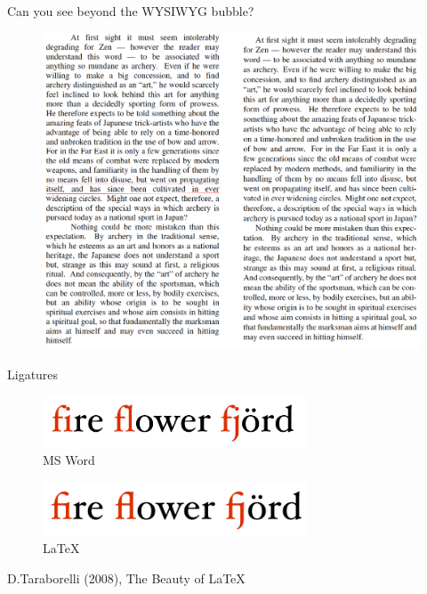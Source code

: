 \documentclass[10pt,times]{beamer}
\begin{document}
\begin{frame}{Can you see beyond the WYSIWYG bubble?}
\begin{figure}
\includegraphics[height=0.85\textheight]{figs/LaTeX_Word.png}
\end{figure}
\end{frame}

\begin{frame}{Ligatures}
\begin{figure}
\centering
\includegraphics[width=0.7\textwidth]{figs/ligatures_word.png}
\caption{MS Word}
\end{figure}
\begin{figure}
\centering
\includegraphics[width=0.7\textwidth]{figs/ligatures_latex.png}
\caption{\LaTeX}
\end{figure}
\flushright
D.Taraborelli (2008), The Beauty of \LaTeX
\end{frame}
\end{document}

